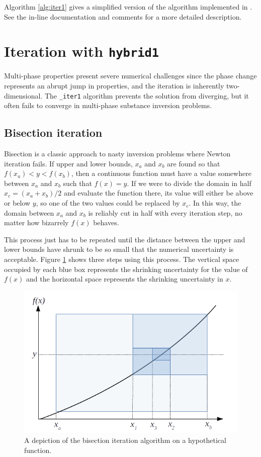 Algorithm \ref{alg:iter1} gives a simplified version of the algorithm implemented in \PM.  See the in-line documentation and comments for a more detailed description.

\section{Iteration with \texttt{hybrid1}}\label{sec:num:hybrid1}

Multi-phase properties present severe numerical challenges since the phase change represents an abrupt jump in properties, and the iteration is inherently two-dimensional.  The \verb|_iter1| algorithm prevents the solution from diverging, but it often fails to converge in multi-phase substance inversion problems.

\subsection{Bisection iteration}\label{sec:num:bisection}

Bisection is a classic approach to nasty inversion problems where Newton iteration fails.  If upper and lower bounds, $x_a$ and $x_b$ are found so that $f(x_a) < y < f(x_b)$, then a continuous function must have a value somewhere between $x_a$ and $x_b$ such that $f(x) = y$.  If we were to divide the domain in half $x_c = (x_a+x_b)/2$ and evaluate the function there, its value will either be above or below $y$, so one of the two values could be replaced by $x_c$.  In this way, the domain between $x_a$ and $x_b$ is reliably cut in half with every iteration step, no matter how bizarrely $f(x)$ behaves.

This process just has to be repeated until the distance between the upper and lower bounds have shrunk to be so small that the numerical uncertainty is acceptable.  Figure \ref{fig:bisection} shows three steps using this process.  The vertical space occupied by each blue box represents the shrinking uncertainty for the value of $f(x)$ and the horizontal space represents the shrinking uncertainty in $x$.

\begin{figure}
\centering
\includegraphics[width=0.97\linewidth]{figures/bisection}
\caption{A depiction of the bisection iteration algorithm on a hypothetical function.}\label{fig:bisection}
\end{figure}

